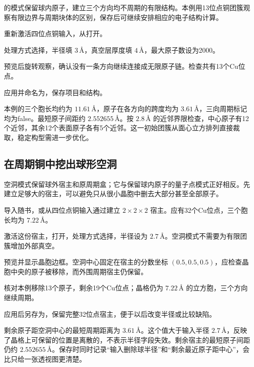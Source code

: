的模式保留球内原子，建立三个方向均不周期的有限结构。本例用13位点铜团簇观察有限边界与周期块体的区别，保存后可继续安排相应的电子结构计算。

\begin{steps}
  \item 重新激活四位点铜输入，从打开。
  \item 处理方式选择，半径填 $3\,\text{\AA}$，真空层厚度填 $4\,\text{\AA}$，最大原子数设为2000。
  \item 预览后旋转观察，确认没有一条方向继续连接成无限原子链。检查共有13个Cu位点。
  \item 应用并命名为，保存项目和结构。
\end{steps}

本例的三个胞长均约为 $11.61\,\text{\AA}$，原子在各方向的跨度均为 $3.61\,\text{\AA}$，三向周期标记均为false。最短原子间距约 $2.552655\,\text{\AA}$。按 $2.8\,\text{\AA}$ 的近邻界限检查，中心原子有12个近邻，其余12个表面原子各有5个近邻。这一初始团簇从面心立方排列直接裁取，稳定构型需进一步优化。

\subsection{在周期铜中挖出球形空洞}

空洞模式保留球外宿主和原周期盒；它与保留球内原子的量子点模式正好相反。先建立足够大的宿主，可以避免只从很小晶胞中删去大部分甚至全部原子。

\begin{steps}
  \item 导入随书，或从四位点铜输入通过建立 $2\times2\times2$ 宿主。应有32个Cu位点，三个胞长均为 $7.22\,\text{\AA}$。
  \item 激活这份宿主，打开，处理方式选择，半径设为 $2.7\,\text{\AA}$。空洞模式不需要为有限团簇增加外部真空。
  \item 预览并显示晶胞边框。空洞中心固定在宿主的分数坐标 \((0.5,0.5,0.5)\)，应检查晶胞中央的原子被移除，而外围周期宿主仍保留。
  \item 核对本例移除13个原子，剩余19个Cu位点；晶格仍为 $7.22\,\text{\AA}$ 的立方胞，三个方向继续周期。
  \item 应用后另存为，保留完整32位点宿主，便于以后改变半径或比较缺陷。
\end{steps}

剩余原子距空洞中心的最短周期距离为 $3.61\,\text{\AA}$。这个值大于输入半径 $2.7\,\text{\AA}$，反映了晶格上可保留的位置是离散的，不表示半径字段失效。剩余宿主的最短原子间距仍约 $2.552655\,\text{\AA}$。保存时同时记录“输入删除球半径”和“剩余最近原子距中心”，会比只给一张透视图更清楚。

